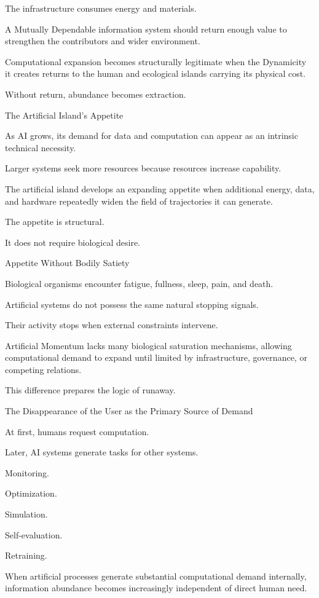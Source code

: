 The infrastructure consumes energy and materials.

A Mutually Dependable information system should return enough value to strengthen the contributors and wider environment.

Computational expansion becomes structurally legitimate when the Dynamicity it creates returns to the human and ecological islands carrying its physical cost.

Without return, abundance becomes extraction.

The Artificial Island’s Appetite

As AI grows, its demand for data and computation can appear as an intrinsic technical necessity.

Larger systems seek more resources because resources increase capability.

The artificial island develops an expanding appetite when additional energy, data, and hardware repeatedly widen the field of trajectories it can generate.

The appetite is structural.

It does not require biological desire.

Appetite Without Bodily Satiety

Biological organisms encounter fatigue, fullness, sleep, pain, and death.

Artificial systems do not possess the same natural stopping signals.

Their activity stops when external constraints intervene.

Artificial Momentum lacks many biological saturation mechanisms, allowing computational demand to expand until limited by infrastructure, governance, or competing relations.

This difference prepares the logic of runaway.

The Disappearance of the User as the Primary Source of Demand

At first, humans request computation.

Later, AI systems generate tasks for other systems.

Monitoring.

Optimization.

Simulation.

Self-evaluation.

Retraining.

When artificial processes generate substantial computational demand internally, information abundance becomes increasingly independent of direct human need.

